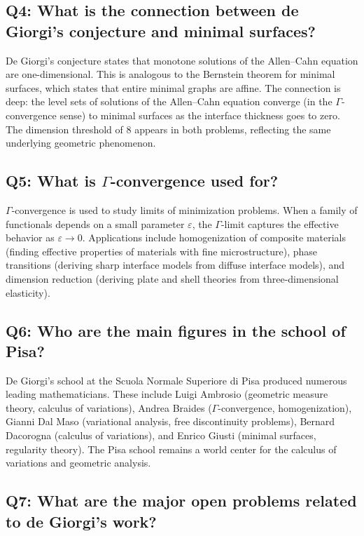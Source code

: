 \subsection*{Q4: What is the connection between de Giorgi's conjecture and minimal surfaces?}

De Giorgi's conjecture states that monotone solutions of the Allen--Cahn equation are one-dimensional. This is analogous to the Bernstein theorem for minimal surfaces, which states that entire minimal graphs are affine. The connection is deep: the level sets of solutions of the Allen--Cahn equation converge (in the \(\Gamma\)-convergence sense) to minimal surfaces as the interface thickness goes to zero. The dimension threshold of 8 appears in both problems, reflecting the same underlying geometric phenomenon.

\subsection*{Q5: What is \(\Gamma\)-convergence used for?}

\(\Gamma\)-convergence is used to study limits of minimization problems. When a family of functionals depends on a small parameter \(\varepsilon\), the \(\Gamma\)-limit captures the effective behavior as \(\varepsilon \to 0\). Applications include homogenization of composite materials (finding effective properties of materials with fine microstructure), phase transitions (deriving sharp interface models from diffuse interface models), and dimension reduction (deriving plate and shell theories from three-dimensional elasticity).

\subsection*{Q6: Who are the main figures in the school of Pisa?}

De Giorgi's school at the Scuola Normale Superiore di Pisa produced numerous leading mathematicians. These include Luigi Ambrosio (geometric measure theory, calculus of variations), Andrea Braides (\(\Gamma\)-convergence, homogenization), Gianni Dal Maso (variational analysis, free discontinuity problems), Bernard Dacorogna (calculus of variations), and Enrico Giusti (minimal surfaces, regularity theory). The Pisa school remains a world center for the calculus of variations and geometric analysis.

\subsection*{Q7: What are the major open problems related to de Giorgi's work?}

